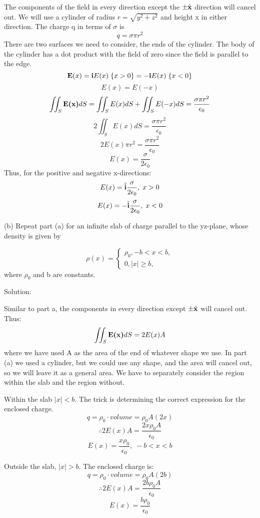 \documentclass{article}
\begin{document}
\begin{enumerate}
    The components of the field in every direction except the $\pm \hat{\textbf{x}}$ direction will cancel out.
    We will use a cylinder of radius $r = \sqrt{y^2 + z^2}$ and height x in either direction.
    The charge q in terms of $\sigma$ is
    \[ q = \sigma \pi r^2 \]
    There are two surfaces we need to consider, the ends of the cylinder. The body of the cylinder has a dot product
    with the field of zero since the field is parallel to the edge.
    \[ \textbf{E}(x) = \textbf{i}E(x) \; \{x>0\} = -\textbf{i}E(x) \; \{x<0\} \]
    \[ E(x) = E(-x) \]
    \[ \iint_S \textbf{E(x)} dS = \iint_S E(x) dS + \iint_S E(-x) dS = \frac{\sigma \pi r^2}{\epsilon_0} \]
    \[ 2 \iint_S E(x) dS = \frac{\sigma \pi r^2}{\epsilon_0} \]
    \[ 2 E(x) \pi r^2 = \frac{\sigma \pi r^2}{\epsilon_0} \]
    \[ E(x) = \frac{\sigma}{2\epsilon_0} \]
    Thus, for the positive and negative x-directions:
    \[ E(x) = \hat{\textbf{i}}\frac{\sigma}{2\epsilon_0}, \; x>0 \]
    \[ E(x) = -\hat{\textbf{i}}\frac{\sigma}{2\epsilon_0}, \; x<0 \]

    (b) Repeat part (a) for an infinite slab of charge parallel to the yz-plane, whose
    density is given by

    \begin{equation*}
        \rho (x) =
            \begin{cases}
                \rho_0, \text{$-b < x < b$}, \\
                0, \text{$|x| \geq b$},
            \end{cases}
    \end{equation*}
    where $\rho_0$ and b are constants.

    Solution:

    Similar to part a, the components in every direction except $\pm \hat{\textbf{x}}$ will cancel out. Thus:
    \[ \iint_S \textbf{E(x)} dS = 2E(x)A \]
    where we have used A as the area of the end of whatever shape we use. In part (a) we used a cylinder, but
    we could use any shape, and the area will cancel out, so we will leave it as a general area. We have to
    separately consider the region within the slab and the region without.

    Within the slab $|x| < b$. The trick is determining the correct expression for the enclosed charge.
    \[ q = \rho_0 \cdot volume = \rho_0 A (2x)\]
    \[ \therefore 2E(x)A = \frac{2x\rho_0A}{\epsilon_0} \]
    \[ E(x) = \frac{x\rho_0}{\epsilon_0}, \; -b < x < b\]

    Outside the slab, $|x| > b$. The enclosed charge is:
    \[ q = \rho_0 \cdot volume = \rho_0 A (2b) \]
    \[ \therefore 2E(x)A = \frac{2b\rho_0A}{\epsilon_0} \]
    \[ E(x) = \frac{b\rho_0}{\epsilon_0} \]


\end{enumerate}
\end{document}
